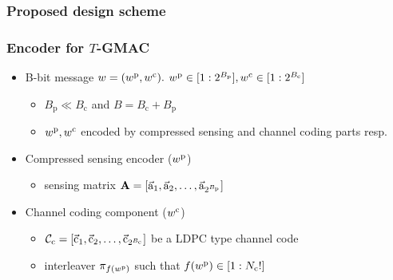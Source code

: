 \documentclass[10pt]{beamer}
\def\mac_figpath{../Figures/MAC}
\begin{document}
\begin{frame}
\frametitle{Proposed design scheme}
\centering
\resizebox{0.85\textwidth}{!}{}

\end{frame}



\begin{frame}
\frametitle{Encoder for $T$-GMAC}

\begin{itemize}
	\item B-bit message $w=(w^\mathrm{p},w^\mathrm{c}).$ $w^\mathrm{p}\in[1:2^{B_{\mathrm{p}}}],w^\mathrm{c}\in[1:2^{B_{\mathrm{c}}}]$
	\begin{itemize}
		\item $B_{\mathrm{p}} \ll B_{\mathrm{c}}$ and $ B=B_{\mathrm{c}}+B_{\mathrm{p}}$
		\item $w^\mathrm{p},w^\mathrm{c}$ encoded by compressed sensing and channel coding parts resp.
	\end{itemize}
	\pause
	\item Compressed sensing encoder ($w^\mathrm{p}$)
	\begin{itemize}
		\item sensing matrix $\mathbf{A}=[\vec{\mathrm{a}}_1,\vec{\mathrm{a}}_2,\ldots,\vec{\mathrm{a}}_{2^{B_{\mathrm{p}}}}]$
		\end{itemize}
	\item Channel coding component ($w^\mathrm{c}$)
	\begin{itemize}
		\item  $\mathcal{C}_{\mathrm{c}}=[\vec{\mathrm{c}}_1,\vec{\mathrm{c}}_2,\ldots,\vec{\mathrm{c}}_{2^{B_{\mathrm{c}}}}]$ be a LDPC type channel code
		\item interleaver $\pi_{f(w^\mathrm{p})}$ such that $f(w^\mathrm{p})\in [1:N_{\mathrm{c}}!]$
		\end{itemize}
\end{itemize}
\vspace{3ex}
\centering
\resizebox{0.6\textwidth}{!}{}

\end{frame}
\end{document}
